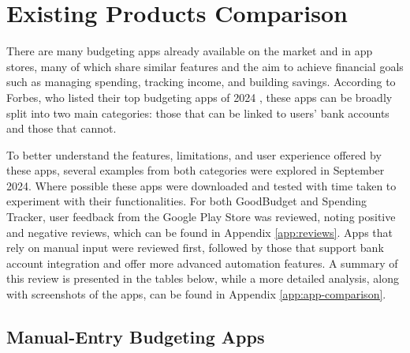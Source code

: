 \documentclass{l4proj}
\begin{document}
\section{Existing Products Comparison}
\label{sec:app-comparison}
There are many budgeting apps already available on the market and in app stores, many of which share similar features and the aim to achieve financial goals such as managing spending, tracking income, and building savings. According to Forbes, who listed their top budgeting apps of 2024 \citep{thornhill_our_2024}, these apps can be broadly split into two main categories: those that can be linked to users' bank accounts and those that cannot.

To better understand the features, limitations, and user experience offered by these apps, several examples from both categories were explored in September 2024. Where possible these apps were downloaded and tested with time taken to experiment with their functionalities. For both GoodBudget and Spending Tracker, user feedback from the Google Play Store was reviewed, noting positive and negative reviews, which can be found in Appendix \ref{app:reviews}. Apps that rely on manual input were reviewed first, followed by those that support bank account integration and offer more advanced automation features. A summary of this review is presented in the tables below, while a more detailed analysis, along with screenshots of the apps, can be found in Appendix \ref{app:app-comparison}.

\subsection{Manual-Entry Budgeting Apps}
\end{document}
